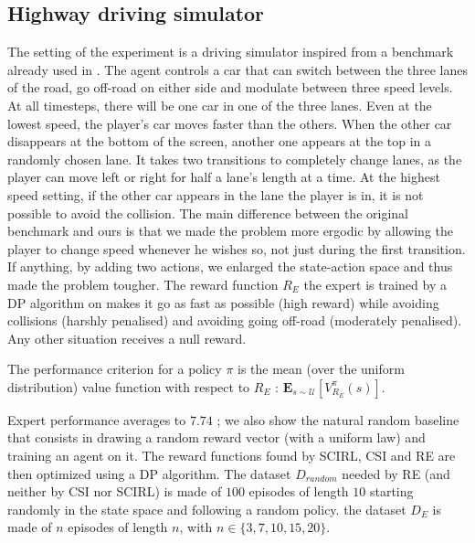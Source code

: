 \documentclass{llncs}
\begin{document}
\subsection{Highway driving simulator}
\label{subsec:highway}
The setting of the experiment is a driving simulator inspired from a benchmark already used in \cite{syed2008apprenticeship,syed2008game}. The agent controls a car that can switch between the three lanes of the road, go off-road on either side and modulate between three speed levels. At all timesteps, there will be one car in one of the three lanes. Even at the lowest speed, the player's car moves faster than the others. When the other car disappears at the bottom of the screen, another one appears at the top in a randomly chosen lane. It takes two transitions to completely change lanes, as the player can move left or right for half a lane's length at a time. At the highest speed setting, if the other car appears in the lane the player is in, it is not possible to avoid the collision. The main difference between the original benchmark \cite{syed2008apprenticeship,syed2008game} and ours is that we made the problem more ergodic by allowing the player to change speed whenever he wishes so, not just during the first transition. If anything, by adding two actions, we enlarged the state-action space and thus made the problem tougher.
The reward function $R_E$ the expert is trained by a DP algorithm on makes it go as fast as possible (high reward) while avoiding collisions (harshly penalised) and avoiding going off-road (moderately penalised). Any other situation receives a null reward.


The performance criterion for a policy $\pi$ is the mean (over the uniform distribution) value function with respect to $R_E$ : $\mathbf{E}_{s\sim\mathcal{U}}[V^{\pi}_{R_E}(s)]$. 

Expert performance averages to $7.74$ ; we also show the natural random baseline that consists in drawing a random reward vector (with a uniform law) and training an agent on it. The reward functions found by SCIRL, CSI and RE are then optimized using a DP algorithm. The dataset $D_{random}$ needed by RE (and neither by CSI nor SCIRL) is made of $100$ episodes of length $10$ starting randomly in the state space and following a random policy. the dataset $D_E$ is made of $n$ episodes of length $n$, with $n \in \{3,7,10,15,20\}$.
\end{document}
